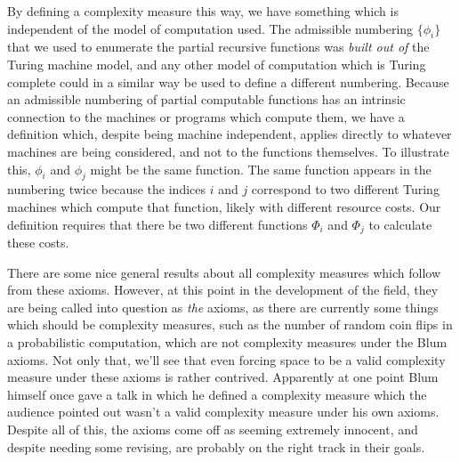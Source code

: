 \documentclass{article}
\theoremstyle{definition}
\theoremstyle{plain}
\theoremstyle{theorem}
\begin{document}
\par By defining a complexity measure this way, we have something which is independent of the model of computation used. The admissible numbering $\{\phi_i\}$ that we used to enumerate the partial recursive functions was \textit{built out of} the Turing machine model, and any other model of computation which is Turing complete could in a similar way be used to define a different numbering. Because an admissible numbering of partial computable functions has an intrinsic connection to the machines or programs which compute them, we have a definition which, despite being machine independent, applies directly to whatever machines are being considered, and not to the functions themselves. To illustrate this, $\phi_i$ and $\phi_j$ might be the same function. The same function appears in the numbering twice because the indices $i$ and $j$ correspond to two different Turing machines which compute that function, likely with different resource costs. Our definition requires that there be two different functions $\Phi_i$ and $\Phi_j$ to calculate these costs. 
\par There are some nice general results about all complexity measures which follow from these axioms. However, at this point in the development of the field, they are being called into question as \textit{the} axioms, as there are currently some things which should be complexity measures, such as the number of random coin flips in a probabilistic computation, which are not complexity measures under the Blum axioms. Not only that, we'll see that even forcing space to be a valid complexity measure under these axioms is rather contrived. Apparently at one point Blum himself once gave a talk in which he defined a complexity measure which the audience pointed out wasn't a valid complexity measure under his own axioms. Despite all of this, the axioms come off as seeming extremely innocent, and despite needing some revising, are probably on the right track in their goals.
\end{document}
